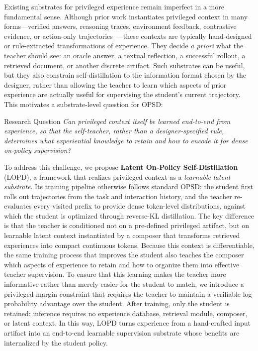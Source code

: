\documentclass{article} %
\newcommand{\ourmethod}{{\textsc{LOPD}}\xspace}
\begin{document}
Existing substrates for privileged experience remain imperfect in a more fundamental sense.
Although prior work instantiates privileged context in many forms---verified answers, reasoning traces, environment feedback, contrastive evidence, or action-only trajectories~\citep{zhao2026selfdistilledreasoneronpolicyselfdistillation,hbotter2026reinforcementlearningselfdistillation,yu2026dopd,penaloza2026privilegedinformationdistillation,yang2026selfdistilledrlvr}---these contexts are typically hand-designed or rule-extracted transformations of experience.
They decide \emph{a priori} what the teacher should see: an oracle answer, a textual reflection, a successful rollout, a retrieved document, or another discrete artifact.
Such substrates can be useful, but they also constrain self-distillation to the information format chosen by the designer, rather than allowing the teacher to learn which aspects of prior experience are actually useful for supervising the student's current trajectory.
This motivates a substrate-level question for OPSD:
\begin{insightbox}{Research Question}
\emph{Can privileged context itself be learned end-to-end from experience, so that the self-teacher, rather than a designer-specified rule, determines what experiential knowledge to retain and how to encode it for dense on-policy supervision?}
\end{insightbox}

To address this challenge, we propose \textbf{Latent On-Policy Self-Distillation} (\ourmethod), a framework that realizes privileged context as a \emph{learnable latent substrate}.
Its training pipeline otherwise follows standard OPSD: the student first rolls out trajectories from the task and interaction history, and the teacher re-evaluates every visited prefix to provide dense token-level distributions, against which the student is optimized through reverse-KL distillation.
The key difference is that the teacher is conditioned not on a pre-defined privileged artifact, but on learnable latent context instantiated by a composer that transforms retrieved experiences into compact continuous tokens.
Because this context is differentiable, the same training process that improves the student also teaches the composer which aspects of experience to retain and how to organize them into effective teacher supervision.
To ensure that this learning makes the teacher more informative rather than merely easier for the student to match, we introduce a privileged-margin constraint that requires the teacher to maintain a verifiable log-probability advantage over the student.
After training, only the student is retained: inference requires no experience database, retrieval module, composer, or latent context.
In this way, \ourmethod turns experience from a hand-crafted input artifact into an end-to-end learnable supervision substrate whose benefits are internalized by the student policy.
\end{document}
